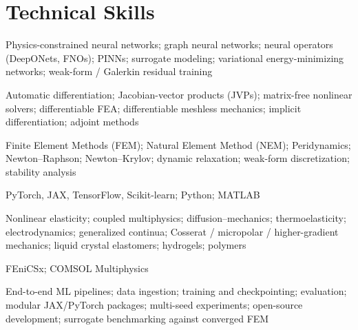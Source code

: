 \documentclass[10pt, letterpaper]{article}
\begin{document}

\section{Technical Skills}

\begin{description}[
  leftmargin=3.65cm,
  style=sameline,
  font=\bfseries\color{navyblue}
]

  \item[Physics AI / ML]
  Physics-constrained neural networks;
  graph neural networks;
  neural operators (DeepONets, FNOs);
  PINNs;
  surrogate modeling;
  variational energy-minimizing networks;
  weak-form / Galerkin residual training

  \item[Differentiable Computing]
  Automatic differentiation;
  Jacobian-vector products (JVPs);
  matrix-free nonlinear solvers;
  differentiable FEA;
  differentiable meshless mechanics;
  implicit differentiation;
  adjoint methods

  \item[Numerical Methods]
  Finite Element Methods (FEM);
  Natural Element Method (NEM);
  Peridynamics;
  Newton--Raphson;
  Newton--Krylov;
  dynamic relaxation;
  weak-form discretization;
  stability analysis

  \item[Scientific Programming]
  PyTorch, JAX, TensorFlow, Scikit-learn;
  Python; MATLAB

  \item[Physics]
  Nonlinear elasticity;
  coupled multiphysics;
  diffusion--mechanics;
  thermoelasticity;
  electrodynamics;
  generalized continua;
  Cosserat / micropolar / higher-gradient mechanics;
  liquid crystal elastomers;
  hydrogels;
  polymers

  \item[Simulation]
  FEniCSx; COMSOL Multiphysics

  \item[Engineering / MLOps]
  End-to-end ML pipelines;
  data ingestion;
  training and checkpointing;
  evaluation;
  modular JAX/PyTorch packages;
  multi-seed experiments;
  open-source development;
  surrogate benchmarking against converged FEM

\end{description}
\end{document}
